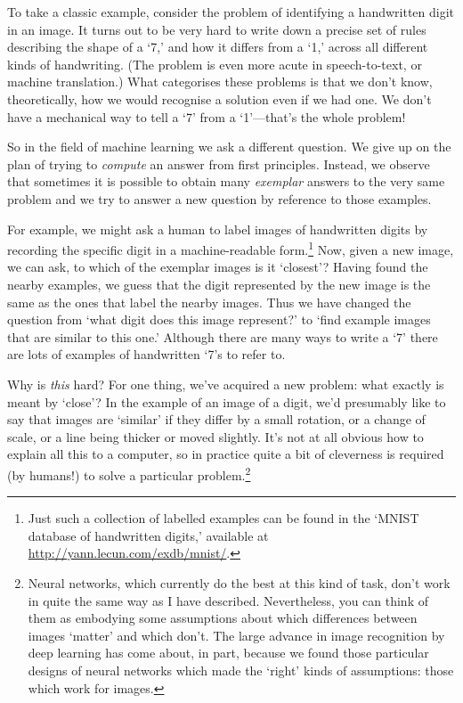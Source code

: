 \documentclass[10pt, a4paper, twocolumn]{article}
\begin{document}
To take a classic example, consider the problem of identifying a handwritten
digit in an image. It turns out to be very hard to write down a precise set of
rules describing the shape of a `7,' and how it differs from a `1,' across all
different kinds of handwriting. (The problem is even more acute in
speech-to-text, or machine translation.) What categorises these problems is that
we don't know, theoretically, how we would recognise a solution even if we had
one. We don't have a mechanical way to tell a `7' from a `1'---that's the whole
problem!

So in the field of machine learning we ask a different question. We give up on
the plan of trying to \emph{compute} an answer from first principles. Instead,
we observe that sometimes it is possible to obtain many \emph{exemplar} answers
to the very same problem and we try to answer a new question by reference to
those examples.

For example, we might ask a human to label images of handwritten digits by
recording the specific digit in a machine-readable form.\footnote{Just such a
collection of labelled examples can be found in the `MNIST database of
handwritten digits,' available at \url{http://yann.lecun.com/exdb/mnist/}.} Now,
given a new image, we can ask, to which of the exemplar images is it `closest'?
Having found the nearby examples, we guess that the digit represented by the new
image is the same as the ones that label the nearby images. Thus we have changed
the question from `what digit does this image represent?' to `find example
images that are similar to this one.' Although there are many ways to write a
`7' there are lots of examples of handwritten `7's to refer to.

Why is \emph{this} hard? For one thing, we've acquired a new problem: what
exactly is meant by `close'? In the example of an image of a digit, we'd
presumably like to say that images are `similar' if they differ by a small
rotation, or a change of scale, or a line being thicker or moved slightly. It's
not at all obvious how to explain all this to a computer, so in practice quite a
bit of cleverness is required (by humans!) to solve a particular
problem.\footnote{Neural networks, which currently do the best at this kind of
task, don't work in quite the same way as I have described. Nevertheless, you
can think of them as embodying some assumptions about which differences between
images `matter' and which don't. The large advance in image recognition by deep
learning has come about, in part, because we found those particular designs of
neural networks which made the `right' kinds of assumptions: those which work
for images.}
\end{document}
